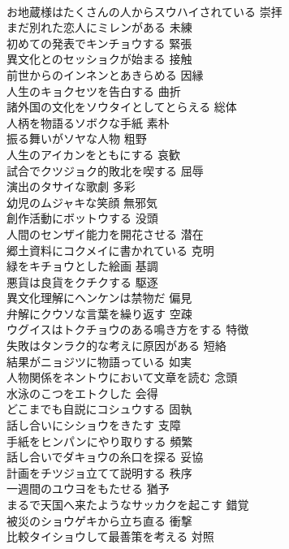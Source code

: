 \documentclass[8pt]{extreport}
\begin{document}
\begin{CJK}{UTF8}{min}
\\	お地蔵様はたくさんの人からスウハイされている	崇拝
\\	まだ別れた恋人にミレンがある	未練
\\	初めての発表でキンチョウする	緊張
\\	異文化とのセッショクが始まる	接触
\\	前世からのインネンとあきらめる	因縁
\\	人生のキョクセツを告白する	曲折
\\	諸外国の文化をソウタイとしてとらえる	総体
\\	人柄を物語るソボクな手紙	素朴
\\	振る舞いがソヤな人物	粗野
\\	人生のアイカンをともにする	哀歓
\\	試合でクツジョク的敗北を喫する	屈辱
\\	演出のタサイな歌劇	多彩
\\	幼児のムジャキな笑顔	無邪気
\\	創作活動にボットウする	没頭
\\	人間のセンザイ能力を開花させる	潜在
\\	郷土資料にコクメイに書かれている	克明
\\	緑をキチョウとした絵画	基調
\\	悪貨は良貨をクチクする	駆逐
\\	異文化理解にヘンケンは禁物だ	偏見
\\	弁解にクウソな言葉を繰り返す	空疎
\\	ウグイスはトクチョウのある鳴き方をする	特徴
\\	失敗はタンラク的な考えに原因がある	短絡
\\	結果がニョジツに物語っている	如実
\\	人物関係をネントウにおいて文章を読む	念頭
\\	水泳のこつをエトクした	会得
\\	どこまでも自説にコシュウする	固執
\\	話し合いにシショウをきたす	支障
\\	手紙をヒンパンにやり取りする	頻繁
\\	話し合いでダキョウの糸口を探る	妥協
\\	計画をチツジョ立てて説明する	秩序
\\	一週間のユウヨをもたせる	猶予
\\	まるで天国へ来たようなサッカクを起こす	錯覚
\\	被災のショウゲキから立ち直る	衝撃
\\	比較タイショウして最善策を考える	対照

\end{CJK}
\end{document}
